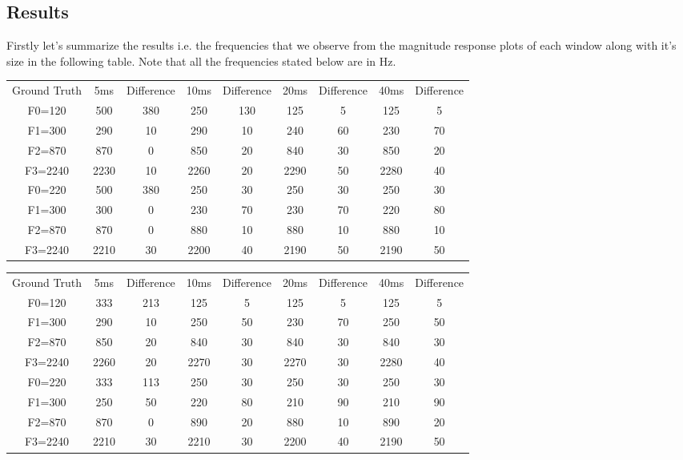 \documentclass{article}
\begin{document}
\subsection{Results}

Firstly let's summarize the results i.e. the frequencies that we observe from the magnitude response plots of each window along with it's size in the following table. Note that all the frequencies stated below are in Hz.

\begin{center}
 \label{tab:title} 
\begin{tabular}{ | c | c | c | c | c | c | c | c | c | } 
 \hline
  Ground Truth & 5ms & Difference & 10ms & Difference & 20ms & Difference & 40ms & Difference \\ 
  F0=120 & 500 & 380 & 250 & 130 & 125 & 5 & 125 & 5\\
  F1=300 & 290 & 10 & 290 & 10 & 240 & 60 & 230 & 70\\
  F2=870 & 870 & 0 & 850 & 20 & 840 & 30 & 850 & 20\\
  F3=2240 & 2230 & 10 & 2260 & 20 & 2290 & 50 & 2280 & 40\\
  \hline
  F0=220 & 500 & 380 & 250 & 30 & 250 & 30 & 250 & 30\\
  F1=300 & 300 & 0 & 230 & 70 & 230 & 70 & 220 & 80\\
  F2=870 & 870 & 0 & 880 & 10 & 880 & 10 & 880 & 10\\
  F3=2240 & 2210 & 30 & 2200 & 40 & 2190 & 50 & 2190 & 50\\
  \hline
\end{tabular}
\end{center}

\begin{center}
 \label{tab:title} 
\begin{tabular}{ | c | c | c | c | c | c | c | c | c | } 
 \hline
  Ground Truth & 5ms & Difference & 10ms & Difference & 20ms & Difference & 40ms & Difference \\ 
  F0=120 & 333 & 213 & 125 & 5 & 125 & 5 & 125 & 5\\
  F1=300 & 290 & 10 & 250 & 50 & 230 & 70 & 250 & 50\\
  F2=870 & 850 & 20 & 840 & 30 & 840 & 30 & 840 & 30 \\
  F3=2240 & 2260 & 20 & 2270 & 30 & 2270 & 30 & 2280 & 40\\
  \hline
  F0=220 & 333 & 113 & 250 & 30 & 250 & 30 & 250 & 30\\
  F1=300 & 250 & 50 & 220 & 80 & 210 & 90 & 210 & 90 \\
  F2=870 & 870 & 0 & 890 & 20 & 880 & 10 & 890 & 20\\
  F3=2240 & 2210 & 30 & 2210 & 30 & 2200 & 40 & 2190 & 50\\
  \hline
\end{tabular}
\end{center}
\newpage
\end{document}
